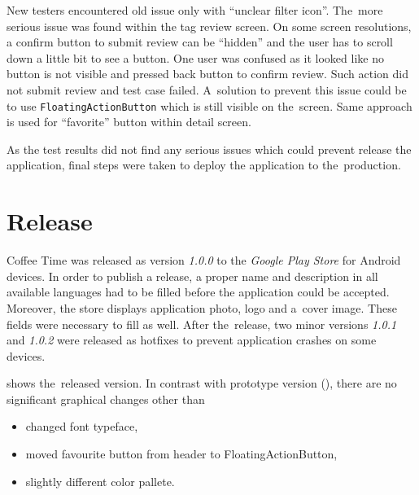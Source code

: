 New testers encountered old issue only with ``unclear filter icon''. The~more serious issue was found within the tag review screen. On some screen resolutions, a confirm button to submit review can be ``hidden'' and the user has to scroll down a little bit to see a button. One user was confused as it looked like no button is not visible and pressed back button to confirm review. Such action did not submit review and test case failed. A~solution to prevent this issue could be to use \verb|FloatingActionButton| which is still visible on the~screen. Same approach is used for ``favorite'' button within detail screen.

As the test results did not find any serious issues which could prevent release the application, final steps were taken to deploy the application to the~production.

\section{Release}
Coffee Time was released as version \textit{1.0.0} to the \textit{Google Play Store} for Android devices. In order to publish a release, a proper name and description in all available languages had to be filled before the application could be accepted. Moreover, the store displays application photo, logo and a~cover image. These fields were necessary to fill as well. After the~release, two minor versions \textit{1.0.1} and \textit{1.0.2} were released as hotfixes to prevent application crashes on some devices.

 shows the~released version. In contrast with prototype version (), there are no significant graphical changes other than 

\begin{itemize}
    \item changed font typeface,
    \item moved favourite button from header to FloatingActionButton,
    \item slightly different color pallete.
\end{itemize}

